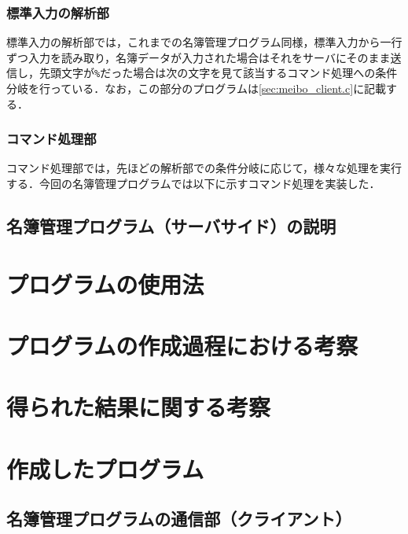 \documentclass[11pt]{jsarticle}
\begin{document}
\subsubsection{標準入力の解析部}

標準入力の解析部では，これまでの名簿管理プログラム同様，標準入力から一行ずつ入力を読み取り，名簿データが入力された場合はそれをサーバにそのまま送信し，先頭文字が{\tt \%}だった場合は次の文字を見て該当するコマンド処理への条件分岐を行っている．なお，この部分のプログラムは\ref{sec:meibo_client.c}に記載する．

\subsubsection{コマンド処理部}

コマンド処理部では，先ほどの解析部での条件分岐に応じて，様々な処理を実行する．今回の名簿管理プログラムでは以下に示すコマンド処理を実装した．


\subsection{名簿管理プログラム（サーバサイド）の説明}

\section{プログラムの使用法}


\section{プログラムの作成過程における考察}
\section{得られた結果に関する考察}
\section{作成したプログラム}

\subsection{名簿管理プログラムの通信部（クライアント）} \label{sec:client.c}
\end{document}
